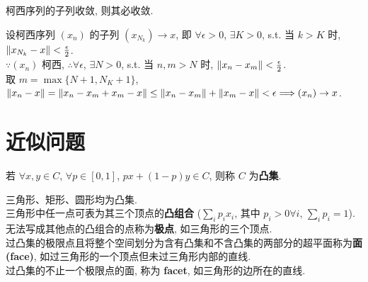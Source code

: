 \documentclass{note}
\begin{document}
\begin{cor}\label{cor-13.1}
    柯西序列的子列收敛, 则其必收敛.
\end{cor}
\begin{pf}
    设柯西序列 $(x_n)$ 的子列 $(x_{N_k})\rightarrow x$, 即 $\forall\epsilon>0$, $\exists K>0$, s.t. 当 $k>K$ 时, $\left\lVert x_{N_k}-x\right\rVert<\frac{\epsilon}{2}$.\\
    $\because(x_n)$ 柯西, $\therefore\forall\epsilon$, $\exists N>0$, s.t. 当 $n,m>N$ 时, $\left\lVert x_n-x_m\right\rVert<\frac{\epsilon}{2}$.\\
    取 $m=\max\{N+1,N_K+1\}$, $\left\lVert x_n-x\right\rVert=\left\lVert x_n-x_m+x_m-x\right\rVert\leq\left\lVert x_n-x_m\right\rVert+\left\lVert x_m-x\right\rVert<\epsilon\Longrightarrow(x_n)\rightarrow x$.
\end{pf}

\section{近似问题}
\begin{df}[凸集]
    若 $\forall x,y\in C$, $\forall p\in[0,1]$, $px+(1-p)y\in C$, 则称 $C$ 为\textbf{凸集}.
\end{df}
\begin{eg}
    三角形、矩形、圆形均为凸集.\\
    三角形中任一点可表为其三个顶点的\textbf{凸组合} ($\sum_ip_ix_i$, 其中 $p_i>0\forall i$, $\sum_ip_i=1$).\\
    无法写成其他点的凸组合的点称为\textbf{极点}, 如三角形的三个顶点.\\
    过凸集的极限点且将整个空间划分为含有凸集和不含凸集的两部分的超平面称为\textbf{面 (face)}, 如过三角形的一个顶点但未过三角形内部的直线.\\
    过凸集的不止一个极限点的面, 称为 \textbf{facet}, 如三角形的边所在的直线.
\end{eg}
\end{document}

